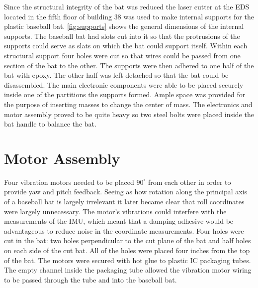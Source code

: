 Since the structural integrity of the bat was reduced the laser cutter at the EDS located in the fifth floor of building 38 was used to make internal supports for the plastic baseball bat.  \autoref{fig:supports} shows the general dimensions of the internal supports.  The baseball bat had slots cut into it so that the protrusions of the supports could serve as slats on which the bat could support itself.  Within each structural support four holes were cut so that wires could be passed from one section of the bat to the other.  The supports were then adhered to one half of the bat with epoxy.  The other half was left detached so that the bat could be disassembled.  The main electronic components were able to be placed securely inside one of the partitions the supports formed.  Ample space was provided for the purpose of inserting masses to change the center of mass.  The electronics and motor assembly proved to be quite heavy so two steel bolts were placed inside the bat handle to balance the bat. 


\section{Motor Assembly}

Four vibration motors needed to be placed $90^{\circ}$ from each other in order to provide yaw and pitch feedback.  Seeing as how rotation along the principal axis of a baseball bat is largely irrelevant it later became clear that roll coordinates were largely unnecessary.  The motor's vibrations could interfere with the measurements of the IMU, which meant that a damping adhesive would be advantageous to reduce noise in the coordinate measurements.  Four holes were cut in the bat: two holes perpendicular to the cut plane of the bat and half holes on each side of the cut bat.  All of the holes were placed four inches from the top of the bat.  The motors were secured with hot glue to plastic IC packaging tubes.  The empty channel inside the packaging tube allowed the vibration motor wiring to be passed through the tube and into the baseball bat.

